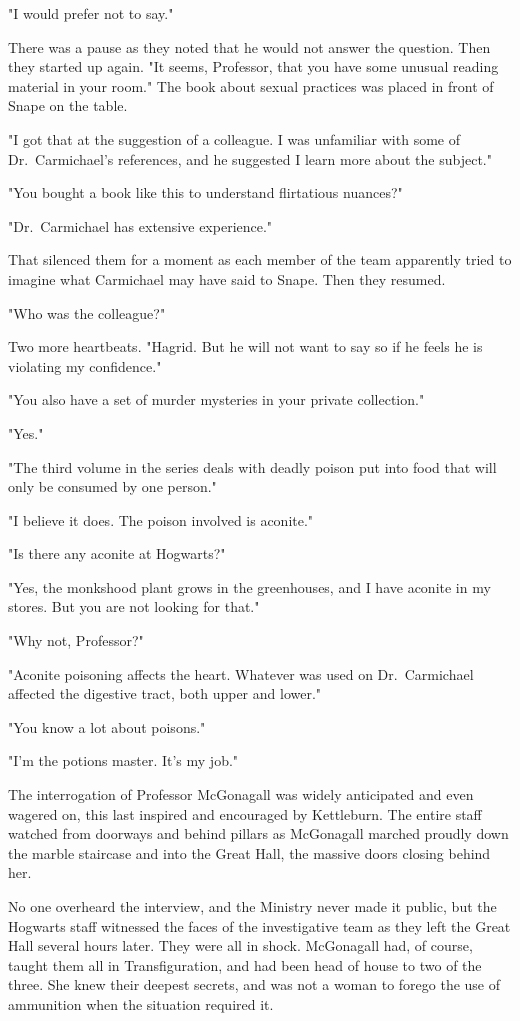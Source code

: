 "I would prefer not to say."

There was a pause as they noted that he would not answer the question. Then they started up again. "It seems, Professor, that you have some unusual reading material in your room." The book about sexual practices was placed in front of Snape on the table.

"I got that at the suggestion of a colleague. I was unfamiliar with some of Dr.~Carmichael's references, and he suggested I learn more about the subject."

"You bought a book like this to understand flirtatious nuances?"

"Dr.~Carmichael has extensive experience."

That silenced them for a moment as each member of the team apparently tried to imagine what Carmichael may have said to Snape. Then they resumed.

"Who was the colleague?"

Two more heartbeats. "Hagrid. But he will not want to say so if he feels he is violating my confidence."

"You also have a set of murder mysteries in your private collection."

"Yes."

"The third volume in the series deals with deadly poison put into food that will only be consumed by one person."

"I believe it does. The poison involved is aconite."

"Is there any aconite at Hogwarts?"

"Yes, the monkshood plant grows in the greenhouses, and I have aconite in my stores. But you are not looking for that."

"Why not, Professor?"

"Aconite poisoning affects the heart. Whatever was used on Dr.~Carmichael affected the digestive tract, both upper and lower."

"You know a lot about poisons."

"I'm the potions master. It's my job."

The interrogation of Professor McGonagall was widely anticipated and even wagered on, this last inspired and encouraged by Kettleburn. The entire staff watched from doorways and behind pillars as McGonagall marched proudly down the marble staircase and into the Great Hall, the massive doors closing behind her.

No one overheard the interview, and the Ministry never made it public, but the Hogwarts staff witnessed the faces of the investigative team as they left the Great Hall several hours later. They were all in shock. McGonagall had, of course, taught them all in Transfiguration, and had been head of house to two of the three. She knew their deepest secrets, and was not a woman to forego the use of ammunition when the situation required it.

